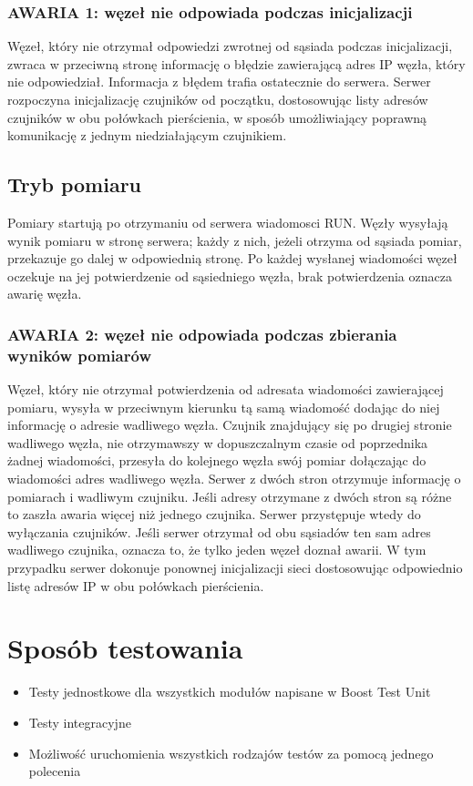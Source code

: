 \documentclass[a4paper,11pt]{article}
\begin{document}
\subsubsection{AWARIA 1: węzeł nie odpowiada podczas inicjalizacji}
Węzeł, który nie otrzymał odpowiedzi zwrotnej od sąsiada podczas inicjalizacji,
zwraca w przeciwną stronę informację o błędzie zawierającą adres IP węzła, który nie odpowiedział.
Informacja z błędem trafia ostatecznie do serwera.
Serwer rozpoczyna inicjalizację czujników od początku,
dostosowując listy adresów czujników w obu połówkach pierścienia,
w sposób umożliwiający poprawną komunikację z jednym niedziałającym czujnikiem.

\subsection{Tryb pomiaru}
Pomiary startują po otrzymaniu od serwera wiadomosci RUN.
Węzły wysyłają wynik pomiaru w stronę serwera; każdy z nich, jeżeli otrzyma od sąsiada pomiar, przekazuje go dalej w odpowiednią stronę.
Po każdej wysłanej wiadomości węzeł oczekuje na jej potwierdzenie od sąsiedniego węzła, brak potwierdzenia oznacza awarię węzła.

\subsubsection{AWARIA 2: węzeł nie odpowiada podczas zbierania wyników pomiarów}
Węzeł, który nie otrzymał potwierdzenia od adresata wiadomości zawierającej pomiaru,
wysyła w przeciwnym kierunku tą samą wiadomość dodając do niej informację o adresie wadliwego węzła.
Czujnik znajdujący się po drugiej stronie wadliwego węzła,
nie otrzymawszy w dopuszczalnym czasie od poprzednika żadnej wiadomości,
przesyła do kolejnego węzła swój pomiar dołączając do wiadomości adres wadliwego węzła.
Serwer z dwóch stron otrzymuje informację o pomiarach i wadliwym czujniku.
Jeśli adresy otrzymane z dwóch stron są różne to zaszła awaria więcej niż jednego czujnika.
Serwer przystępuje wtedy do wyłączania czujników. Jeśli serwer otrzymał od obu sąsiadów
ten sam adres wadliwego czujnika, oznacza to, że tylko jeden węzeł doznał awarii.
W tym przypadku serwer dokonuje ponownej inicjalizacji sieci dostosowując odpowiednio listę
adresów IP w obu połówkach pierścienia.


\section{Sposób testowania}
\begin{itemize}
  \item Testy jednostkowe dla wszystkich modułów napisane w Boost Test Unit
  \item Testy integracyjne
  \item Możliwość uruchomienia wszystkich rodzajów testów za pomocą jednego polecenia
\end{itemize}
\end{document}
